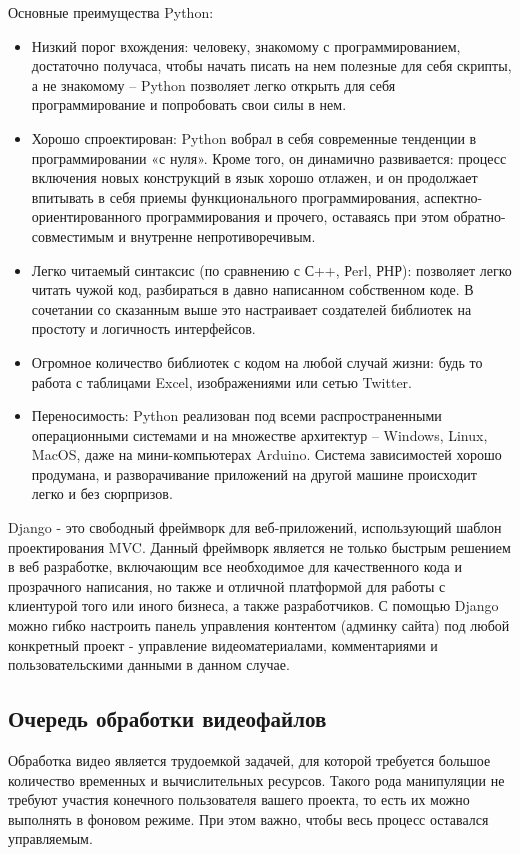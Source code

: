 Основные преимущества Python:
\begin{itemize}
  \item Низкий порог вхождения: человеку, знакомому с программированием, достаточно получаса, чтобы начать писать на нем полезные для себя скрипты, а не знакомому – Python позволяет легко открыть для себя программирование и попробовать свои силы в нем.
  \item Хорошо спроектирован: Python вобрал в себя современные тенденции в программировании «с нуля». Кроме того, он динамично развивается: процесс включения новых конструкций в язык хорошо отлажен, и он продолжает впитывать в себя приемы функционального программирования, аспектно-ориентированного программирования и прочего, оставаясь при этом обратно-совместимым и внутренне непротиворечивым.
  \item Легко читаемый синтаксис (по сравнению с С++, Рerl, РНР): позволяет легко читать чужой код, разбираться в давно написанном собственном коде. В сочетании со сказанным выше это настраивает создателей библиотек на простоту и логичность интерфейсов.
  \item Огромное количество библиотек с кодом на любой случай жизни: будь то работа с таблицами Excel, изображениями или сетью Twitter.
  \item Переносимость: Python реализован под всеми распространенными операционными системами и на множестве архитектур – Windows, Linux, MacOS, даже на мини-компьютерах Arduino. Система зависимостей хорошо продумана, и разворачивание приложений на другой машине происходит легко и без сюрпризов.
\end{itemize}

Django - это свободный фреймворк для веб-приложений, использующий шаблон проектирования MVC.
Данный фреймворк является не только быстрым решением в веб разработке,
включающим все необходимое для качественного кода и прозрачного написания,
но также и отличной платформой для работы с клиентурой того или иного бизнеса,
а также разработчиков. С помощью Django можно гибко настроить панель управления контентом
(админку сайта) под любой конкретный проект - управление видеоматериалами,
комментариями и пользовательскими данными в данном случае.



\subsection{Очередь обработки видеофайлов}

Обработка видео является трудоемкой задачей, для которой требуется большое количество временных
и вычислительных ресурсов. Такого рода манипуляции не требуют участия конечного пользователя
вашего проекта, то есть их можно выполнять в фоновом режиме. При этом важно,
чтобы весь процесс оставался управляемым.

